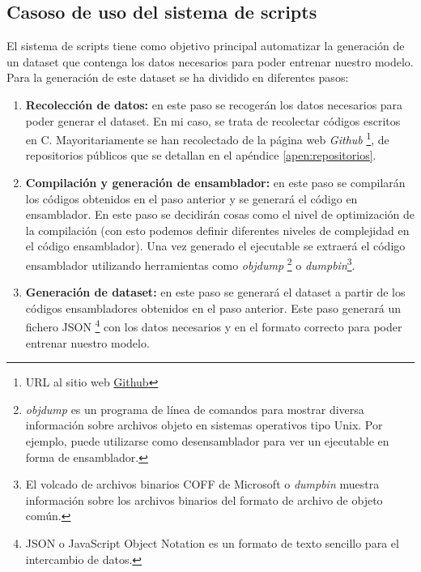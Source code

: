 \subsection{Casoso de uso del sistema de scripts}
\label{subsec:casos_uso_sistema_scripts}


El sistema de scripts tiene como objetivo principal automatizar la generación de un dataset
que contenga los datos necesarios para poder entrenar nuestro modelo. Para la generación
de este dataset se ha dividido en diferentes pasos:


\begin{enumerate}
    \item \textbf{Recolección de datos:} en este paso se recogerán los datos necesarios
        para poder generar el dataset. En mi caso, se trata de recolectar códigos escritos
        en C. Mayoritariamente se han recolectado de la página web \textit{Github}
        \footnote{URL al sitio web \href{https://github.com/}{Github}}, de repositorios 
        públicos que se detallan en el apéndice \ref{apen:repositorios}.
    \item \textbf{Compilación y generación de ensamblador:} en este paso se compilarán los
        códigos obtenidos en el paso anterior y se generará el código en ensamblador. En este
        paso se decidirán cosas como el nivel de optimización de la compilación (con esto podemos
        definir diferentes niveles de complejidad en el código ensamblador). Una vez generado el
        ejecutable se extraerá el código ensamblador utilizando herramientas como \textit{objdump}
        \footnote{\textit{objdump} es un programa de línea de comandos para mostrar 
        diversa información sobre archivos objeto en sistemas operativos tipo Unix. Por ejemplo, 
        puede utilizarse como desensamblador para ver un ejecutable en forma de ensamblador.} o 
        \textit{dumpbin}\footnote{El volcado de archivos binarios COFF de Microsoft o \textit{dumpbin}
        muestra información sobre los archivos binarios del formato de archivo de objeto común.}.
    \item \textbf{Generación de dataset:} en este paso se generará el dataset a partir de los
        códigos ensambladores obtenidos en el paso anterior. Este paso generará un fichero JSON
        \footnote{JSON o JavaScript Object Notation es un formato de texto sencillo para el 
        intercambio de datos.} con los datos necesarios y en el formato correcto para poder 
        entrenar nuestro modelo.
\end{enumerate}

